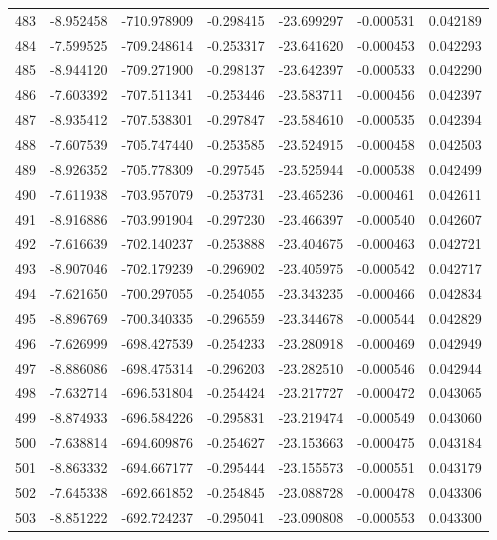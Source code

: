 \begin{tabular}{rrrrrrr}
 483 &  -8.952458 & -710.978909 & -0.298415 & -23.699297 &  -0.000531 &  0.042189 \\
 484 &  -7.599525 & -709.248614 & -0.253317 & -23.641620 &  -0.000453 &  0.042293 \\
 485 &  -8.944120 & -709.271900 & -0.298137 & -23.642397 &  -0.000533 &  0.042290 \\
 486 &  -7.603392 & -707.511341 & -0.253446 & -23.583711 &  -0.000456 &  0.042397 \\
 487 &  -8.935412 & -707.538301 & -0.297847 & -23.584610 &  -0.000535 &  0.042394 \\
 488 &  -7.607539 & -705.747440 & -0.253585 & -23.524915 &  -0.000458 &  0.042503 \\
 489 &  -8.926352 & -705.778309 & -0.297545 & -23.525944 &  -0.000538 &  0.042499 \\
 490 &  -7.611938 & -703.957079 & -0.253731 & -23.465236 &  -0.000461 &  0.042611 \\
 491 &  -8.916886 & -703.991904 & -0.297230 & -23.466397 &  -0.000540 &  0.042607 \\
 492 &  -7.616639 & -702.140237 & -0.253888 & -23.404675 &  -0.000463 &  0.042721 \\
 493 &  -8.907046 & -702.179239 & -0.296902 & -23.405975 &  -0.000542 &  0.042717 \\
 494 &  -7.621650 & -700.297055 & -0.254055 & -23.343235 &  -0.000466 &  0.042834 \\
 495 &  -8.896769 & -700.340335 & -0.296559 & -23.344678 &  -0.000544 &  0.042829 \\
 496 &  -7.626999 & -698.427539 & -0.254233 & -23.280918 &  -0.000469 &  0.042949 \\
 497 &  -8.886086 & -698.475314 & -0.296203 & -23.282510 &  -0.000546 &  0.042944 \\
 498 &  -7.632714 & -696.531804 & -0.254424 & -23.217727 &  -0.000472 &  0.043065 \\
 499 &  -8.874933 & -696.584226 & -0.295831 & -23.219474 &  -0.000549 &  0.043060 \\
 500 &  -7.638814 & -694.609876 & -0.254627 & -23.153663 &  -0.000475 &  0.043184 \\
 501 &  -8.863332 & -694.667177 & -0.295444 & -23.155573 &  -0.000551 &  0.043179 \\
 502 &  -7.645338 & -692.661852 & -0.254845 & -23.088728 &  -0.000478 &  0.043306 \\
 503 &  -8.851222 & -692.724237 & -0.295041 & -23.090808 &  -0.000553 &  0.043300 \\

\end{tabular}
